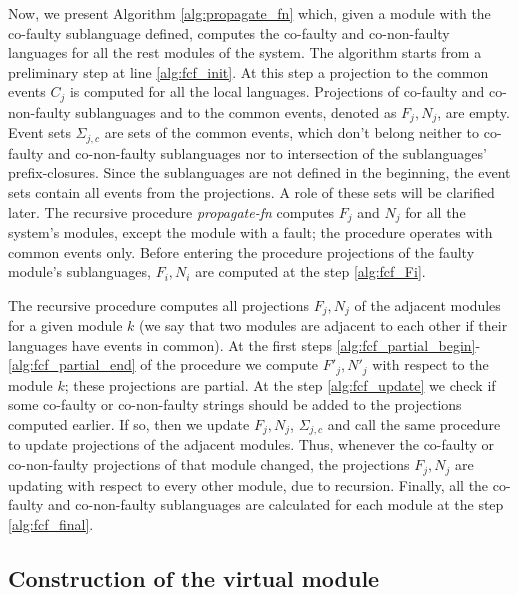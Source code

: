 \documentclass[a4paper, 10pt, conference]{ieeeconf}
\begin{document}
Now, we present Algorithm \ref{alg:propagate_fn} which, given a module with the co-faulty
sublanguage defined, computes the co-faulty and co-non-faulty languages for all
the rest modules of the system.
The algorithm starts from a preliminary step at line \ref{alg:fcf_init}.
At this step a projection to the common events $C_j$ is computed for all the
local languages. Projections of co-faulty and co-non-faulty sublanguages and
to the common events, denoted as $F_j, N_j$, are empty. Event sets
$\Sigma_{j,c}$ are sets of the common events, which don't belong neither to
co-faulty and co-non-faulty sublanguages nor to intersection of the sublanguages'
prefix-closures. Since the sublanguages are not defined in the beginning, the
event sets contain all events from the projections. A role of these sets will be
clarified later.
The recursive procedure \emph{propagate-fn} computes $F_j$ and $N_j$ for all the
system's modules, except the module with a fault; the procedure operates with
common events only. Before entering the procedure projections of the faulty
module's sublanguages, $F_i, N_i$ are computed at the step \ref{alg:fcf_Fi}.

The recursive procedure computes all projections $F_j, N_j$ of the adjacent
modules for a given module $k$ (we say that two modules are adjacent to each
other if their languages have events in common). At the first steps
\ref{alg:fcf_partial_begin}-\ref{alg:fcf_partial_end} of the
procedure we compute $F'_j, N'_j$ with respect to the module $k$; these
projections are partial. At the step \ref{alg:fcf_update} we check if some
co-faulty or co-non-faulty strings should be added to the projections computed
earlier. If so, then we update $F_j, N_j$, $\Sigma_{j,c}$ and call the same
procedure to update projections of the adjacent modules. Thus, whenever the
co-faulty or co-non-faulty projections of that module changed,
the projections $F_j, N_j$ are updating with respect to every other module, due
to recursion.
Finally, all the co-faulty and co-non-faulty sublanguages are calculated
for each module at the step \ref{alg:fcf_final}.



\subsection{Construction of the virtual module}
\end{document}
